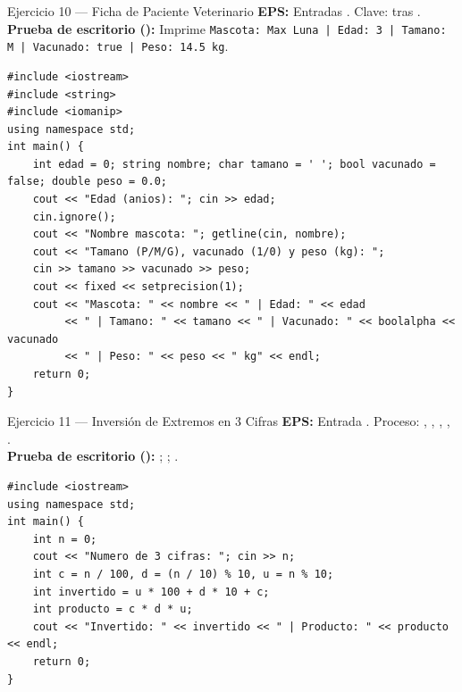 \documentclass[11pt,letterpaper]{article}
\begin{document}
\begin{solucion}{Ejercicio 10 --- Ficha de Paciente Veterinario}
\textbf{EPS:} Entradas . Clave:  tras .\\
\textbf{Prueba de escritorio ():} Imprime \texttt{Mascota: Max Luna | Edad: 3 | Tamano: M | Vacunado: true | Peso: 14.5 kg}.
\end{solucion}
\begin{lstlisting}[style=cppmonitoria]
#include <iostream>
#include <string>
#include <iomanip>
using namespace std;
int main() {
    int edad = 0; string nombre; char tamano = ' '; bool vacunado = false; double peso = 0.0;
    cout << "Edad (anios): "; cin >> edad;
    cin.ignore();
    cout << "Nombre mascota: "; getline(cin, nombre);
    cout << "Tamano (P/M/G), vacunado (1/0) y peso (kg): ";
    cin >> tamano >> vacunado >> peso;
    cout << fixed << setprecision(1);
    cout << "Mascota: " << nombre << " | Edad: " << edad
         << " | Tamano: " << tamano << " | Vacunado: " << boolalpha << vacunado
         << " | Peso: " << peso << " kg" << endl;
    return 0;
}
\end{lstlisting}

\begin{solucion}{Ejercicio 11 --- Inversión de Extremos en 3 Cifras}
\textbf{EPS:} Entrada . Proceso: , , , , .\\
\textbf{Prueba de escritorio ():} ; ; .
\end{solucion}
\begin{lstlisting}[style=cppmonitoria]
#include <iostream>
using namespace std;
int main() {
    int n = 0;
    cout << "Numero de 3 cifras: "; cin >> n;
    int c = n / 100, d = (n / 10) % 10, u = n % 10;
    int invertido = u * 100 + d * 10 + c;
    int producto = c * d * u;
    cout << "Invertido: " << invertido << " | Producto: " << producto << endl;
    return 0;
}
\end{lstlisting}
\end{document}
